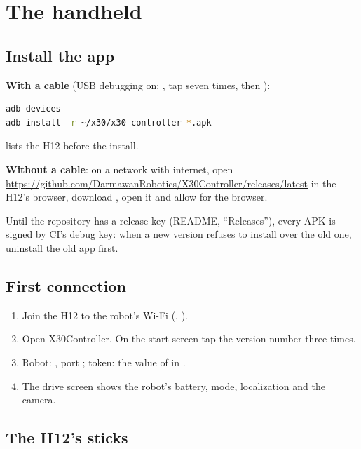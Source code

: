 \chapter{The handheld}
\label{ch:i-handheld}

\section{Install the app}

\textbf{With a cable} (USB debugging on: , tap 
seven times, then ):

\begin{lstlisting}[language=bash]
adb devices
adb install -r ~/x30/x30-controller-*.apk
\end{lstlisting}

 lists the H12 before the install.

\textbf{Without a cable}: on a network with internet, open
\url{https://github.com/DarmawanRobotics/X30Controller/releases/latest} in the H12's browser,
download , open it and allow  for the
browser.

\begin{notebox}
Until the repository has a release key (README, ``Releases''), every APK is signed by CI's
debug key: when a new version refuses to install over the old one, uninstall the old app first.
\end{notebox}

\section{First connection}

\begin{enumerate}
  \item Join the H12 to the robot's Wi-Fi (, ).
  \item Open X30Controller. On the start screen tap the version number three times.
  \item Robot: , port ; token: the value of
     in .
  \item The drive screen shows the robot's battery, mode, localization and the camera.
\end{enumerate}

\section{The H12's sticks}

